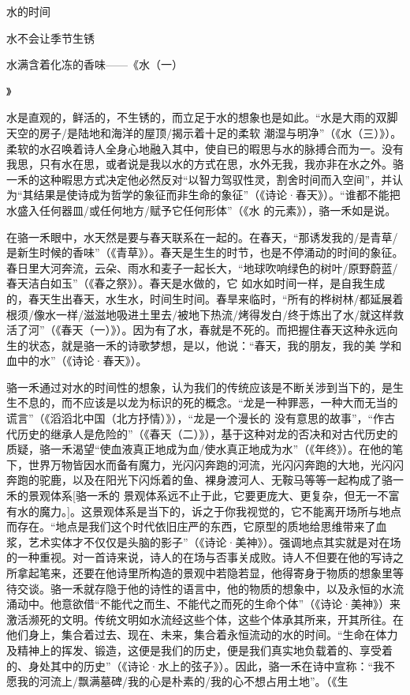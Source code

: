 \documentclass{article}
\begin{document}
    水的时间 


    水不会让季节生锈 

    水满含着化冻的香味——《水（一）
\newpage

》 

水是直观的，鲜活的，不生锈的，而立足于水的想象也是如此。“水是大雨的双脚天空的房子/是陆地和海洋的屋顶/揭示着十足的柔软  潮湿与明净”（《水（三）》）。柔软的水召唤着诗人全身心地融入其中，使自已的暇思与水的脉搏合而为一。没有我思，只有水在思，或者说是我以水的方式在思，水外无我，我亦非在水之外。骆一禾的这种暇思方式决定他必然反对“以智力驾驭性灵，割舍时间而入空间”，并认为“其结果是使诗成为哲学的象征而非生命的象征”（《诗论·春天》）。“谁都不能把水盛入任何器皿/或任何地方/赋予它任何形体”（《水
的元素》），骆一禾如是说。 

在骆一禾眼中，水天然是要与春天联系在一起的。在春天，“那诱发我的/是青草/是新生时候的香味”（《青草》）。春天是生生的时节，也是不停涌动的时间的象征。春日里大河奔流，云朵、雨水和麦子一起长大，“地球吹响绿色的树叶/原野蔚蓝/春天洁白如玉”（《春之祭》）。春天是水做的，它
\newpage
如水如时间一样，是自我生成的，春天生出春天，水生水，时间生时间。春旱来临时，“所有的桦树林/都延展着根须/像水一样/滋滋地吸进土里去/被地下热流/烤得发白/终于炼出了水/就这样救活了河”（《春天（一）》）。因为有了水，春就是不死的。而把握住春天这种永远向生的状态，就是骆一禾的诗歌梦想，是以，他说：“春天，我的朋友，我的美
学和血中的水”（《诗论·春天》）。 

骆一禾通过对水的时间性的想象，认为我们的传统应该是不断关涉到当下的，是生生不息的，而不应该是以龙为标识的死的概念。“龙是一种罪恶，一种大而无当的谎言”（《滔滔北中国（北方抒情）》），“龙是一个漫长的  没有意思的故事”，“作古代历史的继承人是危险的”（《春天（二）》），基于这种对龙的否决和对古代历史的质疑，骆一禾渴望“使血液真正地成为血/使水真正地成为水”（《年终》）。在他的笔下，世界万物皆因水而备有魔力，光闪闪奔跑的河流，光闪闪奔跑的大地，光闪闪奔跑的驼鹿，以及在阳光下闪烁着的鱼、裸身渡河人、无鞍马等等一起构成了骆一禾的景观体系[骆一禾的
\newpage
景观体系远不止于此，它要更庞大、更复杂，但无一不富有水的魔力。]。这景观体系是当下的，诉之于你我视觉的，它不能离开场所与地点而存在。“地点是我们这个时代依旧庄严的东西，它原型的质地给思维带来了血浆，艺术实体才不仅仅是头脑的影子”（《诗论·美神》）。强调地点其实就是对在场的一种重视。对一首诗来说，诗人的在场与否事关成败。诗人不但要在他的写诗之所拿起笔来，还要在他诗里所构造的景观中若隐若显，他得寄身于物质的想象里等待交谈。骆一禾就存隐于他的诗性的语言中，他的物质的想象中，以及永恒的水流涌动中。他意欲借“不能代之而生、不能代之而死的生命个体”（《诗论·美神》）来激活濒死的文明。传统文明如水流经这些个体，这些个体承其所来，开其所往。在他们身上，集合着过去、现在、未来，集合着永恒流动的水的时间。“生命在体力及精神上的挥发、锻造，这便是我们的历史，便是我们真实地负载着的、享受着的、身处其中的历史”（《诗论·水上的弦子》）。因此，骆一禾在诗中宣称：“我不愿我的河流上/飘满墓碑/我的心是朴素的/我的心不想占用土地”。（《生
\end{document}
